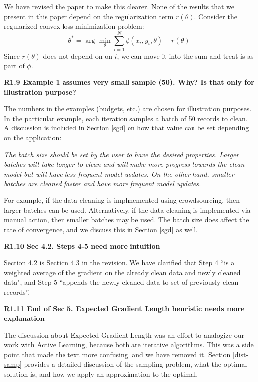 \noindent We have revised the paper to make this clearer.
None of the results that we present in this paper depend on the regularization term $r(\theta)$.
Consider the regularized convex-loss minimization problem:
\[
 \theta^{*}=\arg\min_{\theta}\sum_{i=1}^{N}\phi(x_{i},y_{i},\theta) + r(\theta)
\]
Since $r(\theta)$ does not depend on on $i$, we can move it into the sum and treat is as part of $\phi$.

\vspace{0.5em}

\noindent\textbf{R1.9 Example 1 assumes very small sample (50). Why? Is that only for illustration purpose?}

\noindent   The numbers in the examples (budgets, etc.) are chosen for illustration purposes. In the particular example, each iteration samples a batch of 50 records to clean.  A discussion is included in Section \ref{sgd} on how that value can be set depending on the application:

\vspace{0.5em}
\emph{The batch size should be set by the user to have the desired properties.
Larger batches will take longer to clean and will make more progress towards the clean model but will have less frequent model updates.
On the other hand, smaller batches are cleaned faster and have more frequent model updates.}

\vspace{0.5em}

For example, if the data cleaning is implmemented using crowdsourcing, then larger batches can be used. Alternatively, if the data cleaning is implemented via manual action, then smaller batches may be used.
The batch size does affect the rate of convergence, and we discuss this in Section \ref{sgd} as well. 

\vspace{0.5em}

\noindent\textbf{R1.10 Sec 4.2. Steps 4-5 need more intuition}

\noindent  Section 4.2 is Section 4.3 in the revision. We have clarified that Step 4 ``is a weighted average of the gradient on the already clean data and newly cleaned data", and Step 5 ``appends the newly cleaned data to set of previously clean records''.

\vspace{0.5em}

\noindent\textbf{R1.11 End of Sec 5. Expected Gradient Length heuristic needs more explanation}

\noindent  The discussion about Expected Gradient Length was an effort to analogize our work with Active Learning, because both are iterative algorithms. This was a side point that made the text more confusing, and we have removed it.
Section \ref{dist-samp} provides a detailed discussion of the sampling problem, what the optimal solution is, and how we apply an approximation to the optimal.

